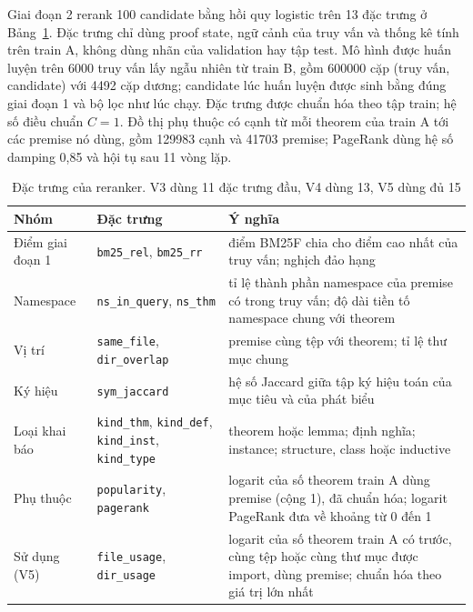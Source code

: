 \documentclass[11pt,a4paper,oneside]{report}
\newcommand{\code}[1]{\texttt{#1}}
\begin{document}
Giai đoạn 2 rerank 100 candidate bằng hồi quy logistic trên 13 đặc trưng ở Bảng~\ref{tab:features}. Đặc trưng chỉ dùng
proof state, ngữ cảnh của truy vấn và thống kê tính trên train A, không dùng nhãn của validation hay tập
test. Mô hình được huấn luyện trên \num{6000} truy vấn lấy ngẫu nhiên từ train B, gồm \num{600000} cặp (truy vấn, candidate) với \num{4492} cặp dương; candidate lúc huấn luyện được sinh bằng đúng giai đoạn 1 và bộ lọc như lúc chạy. Đặc trưng
được chuẩn hóa theo tập train; hệ số điều chuẩn $C = 1$. Đồ thị phụ thuộc có cạnh từ mỗi theorem của train A tới các
premise nó dùng, gồm \num{129983} cạnh và \num{41703} premise; PageRank dùng hệ số damping 0,85 và hội tụ sau 11 vòng lặp.

\begin{table}[htbp]
\centering
\caption[Đặc trưng của reranker]{Đặc trưng của reranker. V3 dùng 11 đặc trưng đầu, V4 dùng 13, V5 dùng đủ 15}\label{tab:features}
\begin{tabularx}{\linewidth}{@{}>{\raggedright\arraybackslash}p{2.1cm}>{\raggedright\arraybackslash}p{3.3cm}X@{}}
\toprule
Nhóm & Đặc trưng & Ý nghĩa \\
\midrule
Điểm giai đoạn 1 & \code{bm25\_rel}, \code{bm25\_rr} & điểm BM25F chia cho điểm cao nhất của truy vấn; nghịch đảo hạng \\
Namespace & \code{ns\_in\_query}, \code{ns\_thm} & tỉ lệ thành phần namespace của premise có trong truy vấn; độ dài tiền tố namespace chung với theorem \\
Vị trí & \code{same\_file}, \code{dir\_overlap} & premise cùng tệp với theorem; tỉ lệ thư mục chung \\
Ký hiệu & \code{sym\_jaccard} & hệ số Jaccard giữa tập ký hiệu toán của mục tiêu và của phát biểu \\
Loại khai báo & \code{kind\_thm}, \code{kind\_def}, \code{kind\_inst}, \code{kind\_type} & theorem hoặc lemma; định nghĩa; instance; structure, class hoặc inductive \\
Phụ thuộc & \code{popularity}, \code{pagerank} & logarit của số theorem train A dùng premise (cộng 1), đã chuẩn hóa; logarit PageRank đưa về khoảng từ 0 đến 1 \\
Sử dụng (V5) & \code{file\_usage}, \code{dir\_usage} & logarit của số theorem train A có trước, cùng tệp hoặc cùng thư mục được import, dùng premise; chuẩn hóa theo giá trị lớn nhất \\
\bottomrule
\end{tabularx}
\end{table}
\end{document}
